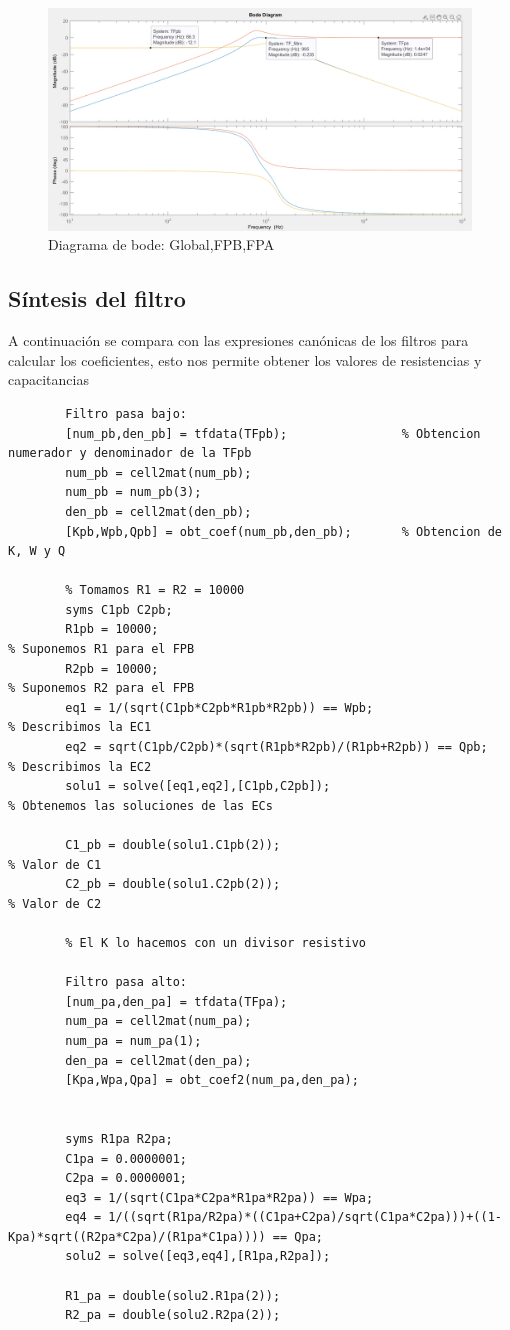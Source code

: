 \documentclass[12pt]{article}
\begin{document}
	\begin{figure}[h!]
		\includegraphics[width=1\linewidth]{Simulaciones_Imagenes/Bode_TFs_Matlab}
		\caption[Diagrama de bode: Global,FPB,FPA]{Diagrama de bode: Global,FPB,FPA}
		\label{fig:bodetfsmatlab}
	\end{figure}
	
	\subsection{Síntesis del filtro}
	A continuación se compara con las expresiones canónicas de los filtros para calcular los coeficientes, esto nos permite obtener los valores de resistencias y capacitancias
	\begin{lstlisting}
		Filtro pasa bajo:
		[num_pb,den_pb] = tfdata(TFpb);                % Obtencion numerador y denominador de la TFpb
		num_pb = cell2mat(num_pb);
		num_pb = num_pb(3);
		den_pb = cell2mat(den_pb);
		[Kpb,Wpb,Qpb] = obt_coef(num_pb,den_pb);       % Obtencion de K, W y Q
		
		% Tomamos R1 = R2 = 10000
		syms C1pb C2pb;
		R1pb = 10000;                                                 % Suponemos R1 para el FPB
		R2pb = 10000;                                                 % Suponemos R2 para el FPB
		eq1 = 1/(sqrt(C1pb*C2pb*R1pb*R2pb)) == Wpb;                   % Describimos la EC1
		eq2 = sqrt(C1pb/C2pb)*(sqrt(R1pb*R2pb)/(R1pb+R2pb)) == Qpb;   % Describimos la EC2
		solu1 = solve([eq1,eq2],[C1pb,C2pb]);                         % Obtenemos las soluciones de las ECs
		
		C1_pb = double(solu1.C1pb(2));                                % Valor de C1
		C2_pb = double(solu1.C2pb(2));                                % Valor de C2
		
		% El K lo hacemos con un divisor resistivo
		
		Filtro pasa alto:
		[num_pa,den_pa] = tfdata(TFpa);
		num_pa = cell2mat(num_pa);
		num_pa = num_pa(1);
		den_pa = cell2mat(den_pa);
		[Kpa,Wpa,Qpa] = obt_coef2(num_pa,den_pa);
		
		
		syms R1pa R2pa;
		C1pa = 0.0000001;
		C2pa = 0.0000001;
		eq3 = 1/(sqrt(C1pa*C2pa*R1pa*R2pa)) == Wpa;
		eq4 = 1/((sqrt(R1pa/R2pa)*((C1pa+C2pa)/sqrt(C1pa*C2pa)))+((1-Kpa)*sqrt((R2pa*C2pa)/(R1pa*C1pa)))) == Qpa;
		solu2 = solve([eq3,eq4],[R1pa,R2pa]);
		
		R1_pa = double(solu2.R1pa(2));
		R2_pa = double(solu2.R2pa(2));
		
	\end{lstlisting}
	
\end{document}
